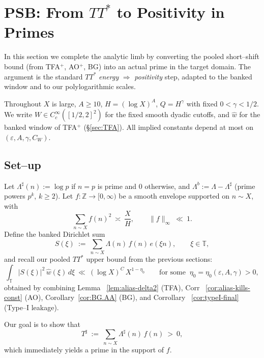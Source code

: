 \section{PSB: From \texorpdfstring{$TT^\ast$}{TT*} to Positivity in Primes}\label{sec:PSB}

In this section we complete the analytic limb by converting the pooled short–shift bound (from TFA$^+$, AO$^+$, BG) into an actual prime in the target domain. The argument is the standard $TT^\ast$ \emph{energy} $\Rightarrow$ \emph{positivity} step, adapted to the banked window and to our polylogarithmic scales.

Throughout $X$ is large, $A\ge 10$, $H=(\log X)^A$, $Q=H^\gamma$ with fixed $0<\gamma<1/2$. We write $W\in C_c^\infty([1/2,2]^2)$ for the fixed smooth dyadic cutoffs, and $\widehat w$ for the banked window of TFA$^+$ (\S\ref{sec:TFA}). All implied constants depend at most on $(\varepsilon,A,\gamma,C_W)$.

\subsection{Set–up}\label{subsec:psb.setup}

Let $\Lambda^\sharp(n):=\log p$ if $n=p$ is prime and $0$ otherwise, and $\Lambda^b:=\Lambda-\Lambda^\sharp$ (prime powers $p^k$, $k\ge2$).
Let $f:\mathbb{Z}\to[0,\infty)$ be a smooth envelope supported on $n\sim X$, with
\begin{equation}\label{eq:psb.mass}
\sum_{n\sim X} f(n)^2\ \asymp\ \frac{X}{H},\qquad
\|f\|_\infty\ \ll\ 1.
\end{equation}
Define the banked Dirichlet sum
\begin{equation}\label{eq:psb.S}
S(\xi)\ :=\ \sum_{n\sim X} \Lambda(n)\,f(n)\,e(\xi n),\qquad \xi\in\mathbb{T},
\end{equation}
and recall our pooled $TT^\ast$ upper bound from the previous sections:
\begin{equation}\label{eq:psb.upper}
\int_{\mathbb{T}}|S(\xi)|^2\,\widehat w(\xi)\,d\xi\ \ll\ (\log X)^C\,X^{1-\eta_0}
\qquad\text{for some }\ \eta_0=\eta_0(\varepsilon,A,\gamma)>0,
\end{equation}
obtained by combining Lemma ~\ref{lem:alias-delta2} (TFA), Corr ~\ref{cor:alias-kills-const} (AO), Corollary~\ref{cor:BG.AA} (BG), and Corrollary ~\ref{cor:typeI-final} (Type--I leakage).

Our goal is to show that
\begin{equation}\label{eq:psb.goal}
T^\sharp\ :=\ \sum_{n\sim X} \Lambda^\sharp(n)\,f(n)\ >\ 0,
\end{equation}
which immediately yields a prime in the support of $f$.

